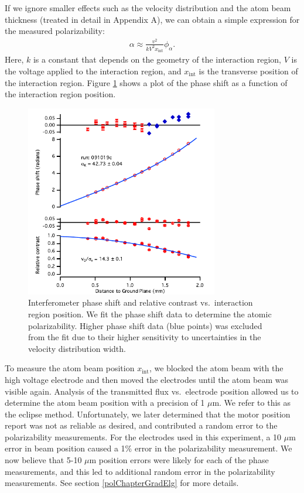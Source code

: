 If we ignore smaller effects such as the velocity distribution and the atom beam thickness (treated in detail in Appendix A), we can obtain a simple expression for the measured polarizability:
\begin{eqnarray}
\label{simplePol}
\alpha \approx \frac{v^2}{kV^2x_\textrm{int}}\phi_\alpha.
\end{eqnarray}
Here, $k$ is a constant that depends on the geometry of the interaction region, $V$ is the voltage applied to the interaction region, and $x_\textrm{int}$ is the transverse position of the interaction region. Figure \ref{phasePosition2010} shows a plot of the phase shift as a function of the interaction region position.

\begin{figure}
\centerline{\includegraphics[width=0.75\textwidth]{Figures/Fig4PhaseFit.pdf}}
\caption[Phase shift and contrast vs.~interaction region position.]{\label{phasePosition2010} Interferometer phase shift and relative contrast vs.~interaction region position. We fit the phase shift data to determine the atomic polarizability. Higher phase shift data (blue points) was excluded from the fit due to their higher sensitivity to uncertainties in the velocity distribution width.}
\end{figure}

To measure the atom beam position $x_\textrm{int}$, we blocked the atom beam with the high voltage electrode and then moved the electrodes until the atom beam was visible again. Analysis of the transmitted flux vs.~electrode position allowed us to determine the atom beam position with a precision of 1 $\mu$m. We refer to this as the eclipse method. Unfortunately, we later determined that the motor position report was not as reliable as desired, and contributed a random error to the polarizability measurements. For the electrodes used in this experiment, a 10 $\mu$m error in beam position caused a 1\% error in the polarizability measurement. We now believe that 5-10 $\mu$m position errors were likely for each of the phase measurements, and this led to additional random error in the polarizability measurements. See section \ref{polChapterGradElg} for more details.


